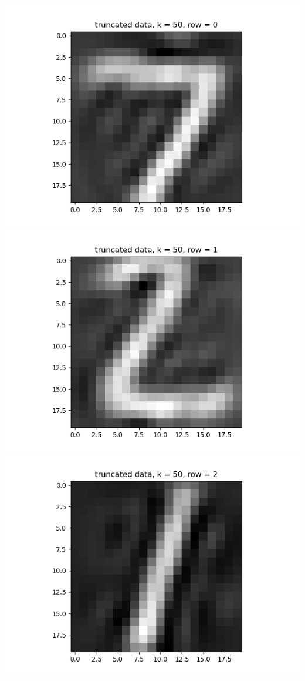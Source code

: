 \documentclass{article}
\begin{document}
\begin{enumerate}
\begin{enumerate}
\begin{center}
			\includegraphics[scale=.4]{hw3 trunc, k = 50, row = 0}
			\includegraphics[scale=.4]{hw3 trunc, k = 50, row = 1}
			\includegraphics[scale=.4]{hw3 trunc, k = 50, row = 2}

\end{center}
\end{enumerate}
\end{enumerate}
\end{document}
